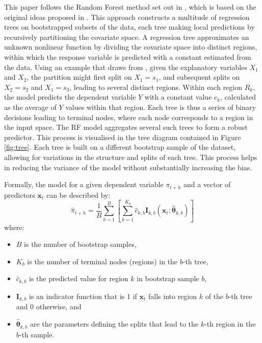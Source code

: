 

This paper follows the Random Forest method set out in \textcite{Medeiros2021ForecastingMethods}, which is based on the original ideas proposed in \textcite{Breiman2001RandomForests}. This approach constructs a multitude of regression trees on bootstrapped subsets of the data, each tree making local predictions by recursively partitioning the covariate space. A regression tree approximates an unknown nonlinear function by dividing the covariate space into distinct regions, within which the response variable is predicted with a constant estimated from the data. Using an example that draws from \textcite{Hastie2009TheLearning}, given the explanatory variables $X_1$ and $X_2$, the partition might first split on $X_1=s_1$, and subsequent splits on $X_2=s_2$ and $X_1=s_3$, leading to several distinct regions. Within each region $R_k$, the model predicts the dependent variable $Y$ with a constant value $c_k$, calculated as the average of $Y$ values within that region. Each tree is thus a series of binary decisions leading to terminal nodes, where each node corresponds to a region in the input space. The RF model aggregates several such trees to form a robust predictor. This process is visualised in the tree diagram contained in Figure \ref{fig:tree}. Each tree is built on a different bootstrap sample of the dataset, allowing for variations in the structure and splits of each tree. This process helps in reducing the variance of the model without substantially increasing the bias.

Formally, the model for a given dependent variable $\pi_{t+h}$ and a vector of predictors $\boldsymbol{x}_t$ can be described by:
$$
\widehat{\pi}_{t+h} = \frac{1}{B} \sum_{b=1}^B \left[ \sum_{k=1}^{K_b} \widehat{c}_{k, b} \mathbf{I}_{k, b}\left(\boldsymbol{x}_t ; \widehat{\boldsymbol{\theta}}_{k, b}\right) \right]
$$
where:
\begin{itemize}[itemsep=0pt,parsep=0pt,topsep=0pt,partopsep=0pt]
    \item $B$ is the number of bootstrap samples,
    \item $K_b$ is the number of terminal nodes (regions) in the $b$-th tree,
    \item $\widehat{c}_{k, b}$ is the predicted value for region $k$ in bootstrap sample $b$,
    \item $\mathbf{I}_{k, b}$ is an indicator function that is 1 if $\boldsymbol{x}_t$ falls into region $k$ of the $b$-th tree and 0 otherwise, and
    \item $\widehat{\boldsymbol{\theta}}_{k, b}$ are the parameters defining the splits that lead to the $k$-th region in the $b$-th sample.
\end{itemize}

